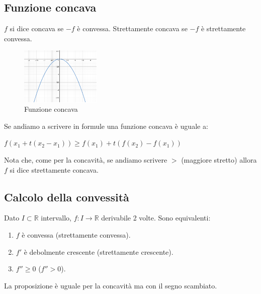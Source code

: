 \subsection{Funzione concava}
\begin{definition}[Concava]
$f$ si dice concava se $-f$ è convessa. Strettamente concava se $-f$ è strettamente convessa.
\end{definition}
\begin{figure}
    \vspace{-10pt}
    \centering
    \includegraphics[width=3.8cm]{images/concava.png}
    \caption{Funzione concava}
\end{figure}
Se andiamo a scrivere in formule una funzione concava è uguale a:
\begin{center}
    $f(x_1 + t(x_2 - x_1)) \geq f(x_1) + t(f(x_2) - f(x_1))$
\end{center}
\begin{note}
Nota che, come per la concavità, se andiamo scrivere $>$ (maggiore stretto) allora $f$ si dice strettamente concava.
\end{note}

\vspace{15pt}
\subsection{Calcolo della convessità}
\begin{proposition}
Dato $I \subset \mathbb{R}$ intervallo, $f: I \to \mathbb{R}$ derivabile 2 volte. Sono equivalenti:
\begin{enumerate}
    \item $f$ è convessa (strettamente convessa).
    \item $f'$ è debolmente crescente (strettamente crescente).
    \item $f'' \geq 0$ ($f'' > 0$).
\end{enumerate}
\end{proposition}

\begin{note}
La proposizione è uguale per la concavità ma con il segno scambiato.
\end{note}


